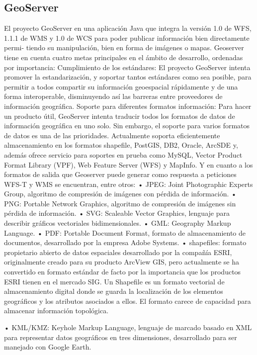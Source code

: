 \subsection{GeoServer}
El proyecto GeoServer en una aplicación Java que integra la versión 1.0 de WFS,
1.1.1 de WMS y 1.0 de WCS para poder publicar información bien directamente permi-
tiendo su manipulación, bien en forma de imágenes o mapas. Geoserver tiene en cuenta
cuatro metas principales en el ámbito de desarrollo, ordenadas por importancia:
Cumplimiento de los estándares: El proyecto GeoServer intenta promover la estandarización, 
y soportar tantos estándares como sea posible, para permitir a todos compartir su información 
geoespacial rápidamente y de una forma interoperable, disminuyendo así las barreras entre 
proveedores de información geográfica.
Soporte para diferentes formatos información: Para hacer un producto útil, GeoServer intenta 
traducir todos los formatos de datos de información geográfica en uno solo. Sin embargo, 
el soporte para varios formatos de datos es una de las prioridades. Actualmente soporta 
eficientemente almacenamiento en los formatos shapefile, PostGIS, DB2, Oracle, ArcSDE y, 
además ofrece servicio para soportes en prueba como MySQL, Vector Product Format Library 
(VPF), Web Feature Server (WFS) y MapInfo. Y en cuanto a los formatos de salida que Geoserver
puede generar como respuesta a peticiones WFS-T y WMS se encuentran, entre
otros:
• JPEG: Joint Photographic Experts Group, algoritmo de compresión de imágenes con pérdida 
de información.
• PNG: Portable Network Graphics, algoritmo de compresión de imágenes sin
pérdida de información.
• SVG: Scaleable Vector Graphics, lenguaje para describir gráficos vectoriales
bidimensionales.
• GML: Geography Markup Language.
• PDF: Portable Document Format, formato de almacenamiento de documentos, desarrollado 
por la empresa Adobe Systems.
• shapefiles: formato propietario abierto de datos espaciales desarrollado por la compañía ESRI,
originalmente creado para su producto ArcView GIS, pero actualmente se ha convertido en formato estándar
de facto por la importancia que los productos ESRI tienen en el mercado SIG. Un Shapefile es un formato
vectorial de almacenamiento digital donde se guarda la localización de los elementos geográficos y los
atributos asociados a ellos. El formato carece de capacidad para almacenar información topológica.

• KML/KMZ: Keyhole Markup Language, lenguaje de marcado basado en XML para representar datos geográficos
en tres dimensiones, desarrollado para ser manejado con Google Earth. 


